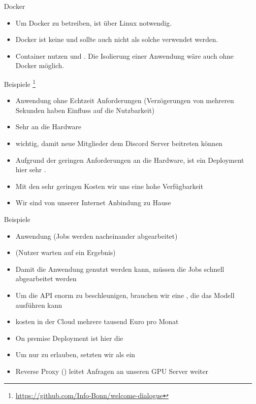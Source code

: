 \documentclass[12pt, aspectratio=169, usepdftitle=false]{beamer}
\newcommand{\furl}[1]{\footnote{\url{#1}}}
\begin{document}
\begin{frame}[fragile]{Docker}
	\begin{itemize}
		\item \pause Um Docker  zu betreiben, ist  über Linux  notwendig.
		\item \pause Docker ist keine  und sollte auch nicht als solche verwendet werden.
		\item \pause Container nutzen  und . Die Isolierung einer Anwendung wäre auch ohne Docker möglich.
	\end{itemize}
\end{frame}

\begin{frame}[fragile]{Beispiele}
	\furl{https://github.com/Info-Bonn/welcome-dialogue}
	\begin{itemize}
		\item \pause {} Anwendung ohne Echtzeit Anforderungen (Verzögerungen von mehreren Sekunden haben  Einfluss auf die Nutzbarkeit)
		\item \pause Sehr  an die Hardware
		\item \pause {} wichtig, damit neue Mitglieder dem Discord Server beitreten können
		\item \pause Aufgrund der geringen Anforderungen an die Hardware, ist ein  Deployment hier sehr .
		\item \pause Mit den sehr geringen Kosten  wir uns eine hohe Verfügbarkeit
		\item \pause Wir sind  von unserer Internet Anbindung zu Hause
	\end{itemize}
\end{frame}

\begin{frame}[fragile]{Beispiele}
	\begin{itemize}
		\item \pause {} Anwendung (Jobs werden nacheinander abgearbeitet)
		\item \pause {} (Nutzer warten auf ein Ergebnis)
		\item \pause Damit die Anwendung  genutzt werden kann, müssen die Jobs schnell abgearbeitet werden
		\item \pause Um die API enorm zu beschleunigen, brauchen wir eine , die das Modell ausführen kann
		\item \pause {} kosten in der Cloud mehrere tausend Euro pro Monat
		\item \pause On premise Deployment ist hier die 
		\item \pause Um nur  zu erlauben, setzten wir  als  ein
		\item \pause Reverse Proxy () leitet  Anfragen an unseren GPU Server weiter
	\end{itemize}
\end{frame}
\end{document}
